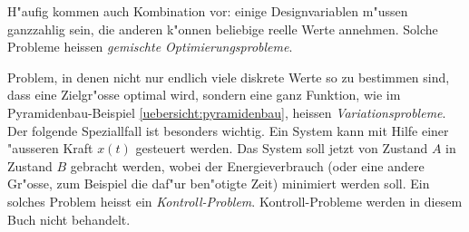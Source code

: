 H"aufig kommen auch Kombination vor: einige Designvariablen m"ussen
ganzzahlig sein, die anderen k"onnen beliebige reelle Werte annehmen.
Solche Probleme heissen {\em gemischte Optimierungsprobleme}.

Problem, in denen nicht nur endlich viele diskrete Werte so zu bestimmen
sind, dass eine Zielgr"osse optimal wird, sondern eine ganz Funktion,
wie im Pyramidenbau-Beispiel \ref{uebersicht:pyramidenbau}, heissen
{\em Variationsprobleme}. Der folgende Speziallfall ist besonders wichtig.
Ein System kann mit Hilfe einer "ausseren Kraft $x(t)$ gesteuert werden.
Das System soll jetzt von Zustand $A$ in Zustand $B$ gebracht werden,
wobei der Energieverbrauch (oder eine andere Gr"osse, zum Beispiel die
daf"ur ben"otigte Zeit) minimiert werden soll. Ein solches Problem heisst
ein {\em Kontroll-Problem}.
Kontroll-Probleme werden in diesem Buch nicht
behandelt.
